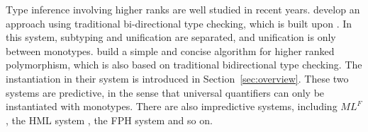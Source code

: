 Type inference involving higher ranks are well studied in recent years.
\citet{jones2007practical} develop an approach using traditional bi-directional
type checking, which is built upon \citet{odersky1996putting}. In this system,
subtyping and unification are separated, and unification is only between
monotypes. \citet{dunfield2013complete} build a simple and concise algorithm for
higher ranked polymorphism, which is also based on traditional bidirectional
type checking. The instantiation in their system is introduced in
Section~\ref{sec:overview}. These two systems are predictive, in the sense that
universal quantifiers can only be instantiated with monotypes. There are also
impredictive systems, including $ML^F$
\citep{le2014mlf,remy2008graphic,le2009recasting}, the HML system
\citep{leijen2009flexible}, the FPH system \citep{vytiniotis2008fph} and so on.
